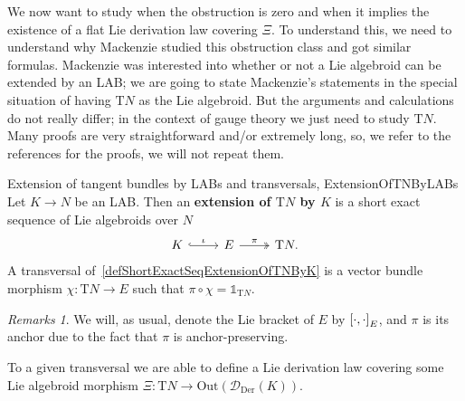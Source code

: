 \documentclass[preprint]{elsarticle}
\def\be{\begin{equation}}
\def\ee{\end{equation}}
\theoremstyle{plain}
\theoremstyle{remark}
\newtheorem{remark}[theorem]{Remarks}
\theoremstyle{definition}
\begin{document}
We now want to study when the obstruction is zero and when it implies the existence of a flat Lie derivation law covering $\Xi$. To understand this, we need to understand why Mackenzie studied this obstruction class and got similar formulas. Mackenzie was interested into whether or not a Lie algebroid can be extended by an LAB; we are going to state Mackenzie's statements in the special situation of having $\mathrm{T}N$ as the Lie algebroid. But the arguments and calculations do not really differ; in the context of gauge theory we just need to study $\mathrm{T}N$. Many proofs are very straightforward and/or extremely long, so, we refer to the references for the proofs, we will not repeat them.

\begin{definitions}{Extension of tangent bundles by LABs and transversals, \newline \cite[\S 7.1, Definition 7.1.11, page 266, and Definition 7.3.1, page 277]{mackenzieGeneralTheory}}{ExtensionOfTNByLABs}
Let $K \to N$ be an LAB. Then an \textbf{extension of $\mathrm{T}N$ by $K$} is a short exact sequence of Lie algebroids over $N$
\be\label{defShortExactSeqExtensionOfTNByK}
	\begin{tikzcd}
		K \arrow[hook]{r}{\iota} & E \arrow[two heads]{r}{\pi} & \mathrm{T}N.
	\end{tikzcd}
\ee
A transversal of~\eqref{defShortExactSeqExtensionOfTNByK} is a vector bundle morphism $\chi: \mathrm{T}N \to E$ such that $\pi \circ \chi = \mathds{1}_{\mathrm{T}N}$.
\end{definitions}

\begin{remark}
\leavevmode\newline
We will, as usual, denote the Lie bracket of $E$ by $\mleft[ \cdot, \cdot \mright]_E$, and $\pi$ is its anchor due to the fact that $\pi$ is anchor-preserving.
\end{remark}

To a given transversal we are able to define a Lie derivation law covering some Lie algebroid morphism $\Xi: \mathrm{T}N \to \mathrm{Out}(\mathcal{D}_{\mathrm{Der}}(K))$.
\end{document}
